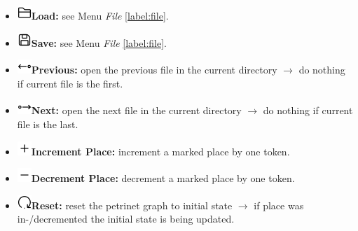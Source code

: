 \documentclass[10pt, a4paper]{article}
\begin{document}
\begin{itemize}

\item\includegraphics[scale=0.4]{../../src/resources/images/Toolbar/folder.png}\hspace{0.1cm}\textbf{Load:} see Menu \textit{File} \ref{label:file}.
\item\includegraphics[scale=0.4]{../../src/resources/images/Toolbar/save.png}\hspace{0.1cm}\textbf{Save:} see Menu \textit{File} \ref{label:file}.
\item\includegraphics[scale=0.4]{../../src/resources/images/Toolbar/left.png}\hspace{0.1cm}\textbf{Previous:} open the previous file in the current directory $\rightarrow$ do nothing if current file is the first.
\item\includegraphics[scale=0.4]{../../src/resources/images/Toolbar/right.png}\hspace{0.1cm}\textbf{Next:} open the next file in the current directory $\rightarrow$ do nothing if current file is the last.
\item\includegraphics[scale=0.4]{../../src/resources/images/Toolbar/plus.png}\hspace{0.1cm}\textbf{Increment Place:} increment a marked place by one token.
\item\includegraphics[scale=0.4]{../../src/resources/images/Toolbar/minus.png}\hspace{0.1cm}\textbf{Decrement Place:} decrement a marked place by one token.
\item\includegraphics[scale=0.4]{../../src/resources/images/Toolbar/restart.png}\hspace{0.1cm}\textbf{Reset:} reset the petrinet graph to initial state $\rightarrow$ if place was in-/decremented the initial state is being updated.

\end{itemize}
\end{document}
